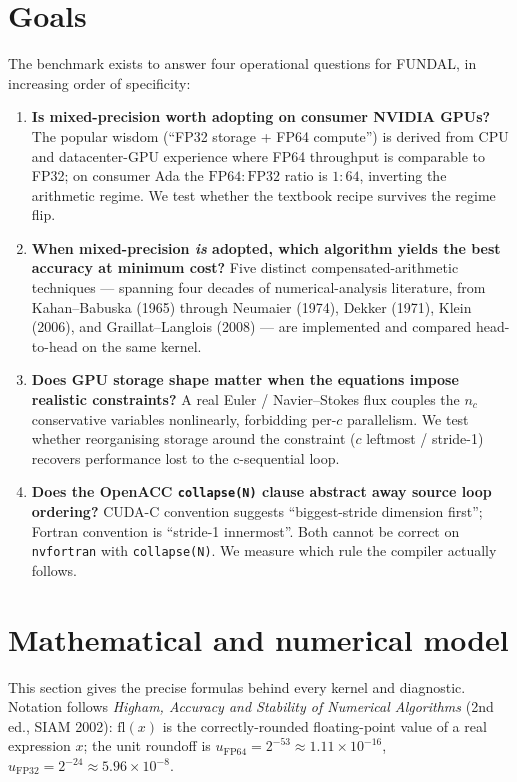 \documentclass[11pt,a4paper]{article}
\begin{document}
\section{Goals}
\label{sec:goals}

The benchmark exists to answer four operational questions for FUNDAL,
in increasing order of specificity:

\begin{enumerate}
  \item \textbf{Is mixed-precision worth adopting on consumer NVIDIA
    GPUs?} The popular wisdom (``FP32 storage + FP64 compute'') is
    derived from CPU and datacenter-GPU experience where FP64
    throughput is comparable to FP32; on consumer Ada the
    \(\mathrm{FP64{:}FP32}\) ratio is \(1{:}64\), inverting the
    arithmetic regime. We test whether the textbook recipe survives
    the regime flip.
  \item \textbf{When mixed-precision \emph{is} adopted, which
    algorithm yields the best accuracy at minimum cost?} Five
    distinct compensated-arithmetic techniques --- spanning four
    decades of numerical-analysis literature, from Kahan--Babuska
    (1965) through Neumaier (1974), Dekker (1971), Klein (2006), and
    Graillat--Langlois (2008) --- are implemented and compared
    head-to-head on the same kernel.
  \item \textbf{Does GPU storage shape matter when the equations
    impose realistic constraints?} A real Euler / Navier--Stokes flux
    couples the \(n_c\) conservative variables nonlinearly, forbidding
    per-\(c\) parallelism. We test whether reorganising storage
    around the constraint (\(c\) leftmost / stride-1) recovers
    performance lost to the c-sequential loop.
  \item \textbf{Does the OpenACC \texttt{collapse(N)} clause abstract
    away source loop ordering?} CUDA-C convention suggests
    ``biggest-stride dimension first''; Fortran convention is
    ``stride-1 innermost''. Both cannot be correct on
    \texttt{nvfortran} with \texttt{collapse(N)}. We measure which
    rule the compiler actually follows.
\end{enumerate}

\section{Mathematical and numerical model}
\label{sec:math}

This section gives the precise formulas behind every kernel and
diagnostic.  Notation follows
\textit{Higham, Accuracy and Stability of Numerical Algorithms} (2nd
ed., SIAM 2002): \(\mathrm{fl}(x)\) is the correctly-rounded
floating-point value of a real expression \(x\); the unit roundoff is
\(u_{\mathrm{FP64}} = 2^{-53} \approx 1.11\times 10^{-16}\), \(u_{\mathrm{FP32}} = 2^{-24} \approx 5.96\times 10^{-8}\).
\end{document}

